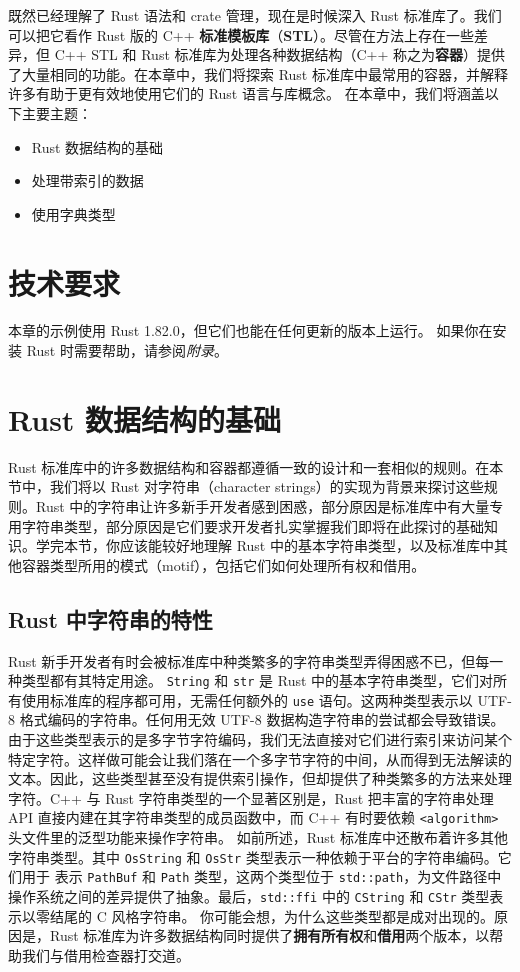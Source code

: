 \label{idx:idx_c5d289c6}
\label{idx:idx_ccc3d5f7}
既然已经理解了 Rust 语法和 crate 管理，现在是时候深入 Rust 标准库了。我们可以把它看作 Rust 版的 C++ \textbf{标准模板库}（\textbf{STL}）。尽管在方法上存在一些差异，但 C++ STL 和 Rust 标准库为处理各种数据结构（C++ 称之为\textbf{容器}）提供了大量相同的功能。在本章中，我们将探索 Rust 标准库中最常用的容器，并解释许多有助于更有效地使用它们的 Rust 语言与库概念。
在本章中，我们将涵盖以下主要主题：
\begin{itemize}
  \item Rust 数据结构的基础
  \item 处理带索引的数据
  \item 使用字典类型
\end{itemize}
\section{技术要求}
本章的示例使用 Rust 1.\allowbreak{}82.\allowbreak{}0，但它们也能在任何更新的版本上运行。
如果你在安装 Rust 时需要帮助，请参阅\emph{附录}。
\section{Rust 数据结构的基础}
\label{idx:idx_b459d41d}
Rust 标准库中的许多数据结构和容器都遵循一致的设计和一套相似的规则。在本节中，我们将以 Rust 对字符串（character strings）的实现为背景来探讨这些规则。Rust 中的字符串让许多新手开发者感到困惑，部分原因是标准库中有大量专用字符串类型，部分原因是它们要求开发者扎实掌握我们即将在此探讨的基础知识。学完本节，你应该能较好地理解 Rust 中的基本字符串类型，以及标准库中其他容器类型所用的模式（motif），包括它们如何处理所有权和借用。
\subsection{Rust 中字符串的特性}
\label{idx:idx_795e037b}
Rust 新手开发者有时会被标准库中种类繁多的字符串类型弄得困惑不已，但每一种类型都有其特定用途。
\texttt{String} 和 \texttt{str} 是 Rust 中的基本字符串类型，它们对所有使用标准库的程序都可用，无需任何额外的 \texttt{use} 语句。这两种类型表示以 UTF-\allowbreak{}8 格式编码的字符串。任何用无效 UTF-\allowbreak{}8 数据构造字符串的尝试都会导致错误。
由于这些类型表示的是多字节字符编码，我们无法直接对它们进行索引来访问某个特定字符。这样做可能会让我们落在一个多字节字符的中间，从而得到无法解读的文本。因此，这些类型甚至没有提供索引操作，但却提供了种类繁多的方法来处理字符。C++ 与 Rust 字符串类型的一个显著区别是，Rust 把丰富的字符串处理 API 直接内建在其字符串类型的成员函数中，而 C++ 有时要依赖 \texttt{<algorithm>} 头文件里的泛型功能来操作字符串。
如前所述，Rust 标准库中还散布着许多其他字符串类型。其中
\texttt{OsString} 和 \texttt{OsStr} 类型表示一种依赖于平台的字符串编码。它们用于
表示 \texttt{PathBuf} 和 \texttt{Path} 类型，这两个类型位于 \texttt{std::path}，为文件路径中操作系统之间的差异提供了抽象。最后，\texttt{std::ffi} 中的 \texttt{CString} 和 \texttt{CStr} 类型表示以零结尾的 C 风格字符串。
\label{idx:idx_c2eb38e2}
你可能会想，为什么这些类型都是成对出现的。原因是，Rust 标准库为许多数据结构同时提供了\textbf{拥有所有权}和\textbf{借用}两个版本，以帮助我们与借用检查器打交道。
